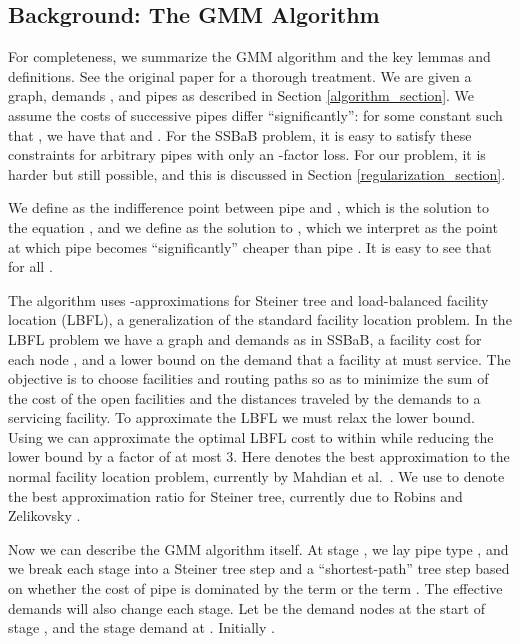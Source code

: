 \documentclass[11pt]{article}
\begin{document}
\subsection{Background: The GMM Algorithm}

For completeness, we summarize the GMM algorithm and the key lemmas and definitions.  See the original paper \cite{guha2001cfa} for a thorough treatment.  We are given a graph, demands , and pipes  as described in Section \ref{algorithm_section}.  
We assume the costs of successive pipes differ ``significantly'': for some constant  such that , we have that  and .  For the SSBaB problem, it is easy to satisfy these constraints for arbitrary pipes with only an -factor loss.  For our problem, it is harder but still possible, and this is discussed in Section \ref{regularization_section}.  

We define  as the indifference point between pipe  and , which is the solution to the equation , and we define  as the solution to , which we interpret as the point at which pipe  becomes ``significantly'' cheaper than pipe .  It is easy to see that  for all .

The algorithm uses -approximations for Steiner tree and load-balanced facility location (LBFL), a generalization of the standard facility location problem.  In the LBFL problem we have a graph and demands as in SSBaB, a facility cost  for each node , and a lower bound  on the demand that a facility at  must service.  The objective is to choose facilities and routing paths so as to minimize the sum of the cost of the open facilities and the distances traveled by the demands to a servicing facility.  To approximate the LBFL we must relax the lower bound.  Using \cite{guha2000hpa} we can approximate the optimal LBFL cost to within  while reducing the lower bound by a factor of at most 3.  Here  denotes the best approximation to the normal facility location problem, currently  by Mahdian et al.\ \cite{mahdian2002iaa}.  We use  to denote the best approximation ratio for Steiner tree, currently  due to Robins and Zelikovsky \cite{robins2000ist}.

Now we can describe the GMM algorithm itself.  At stage , we lay pipe type , and we break each stage into a Steiner tree step and a ``shortest-path'' tree step based on whether the cost of pipe  is dominated by the term  or the term .  The effective demands will also change each stage.  Let  be the demand nodes at the start of stage , and  the stage  demand at .  Initially .
\end{document}
